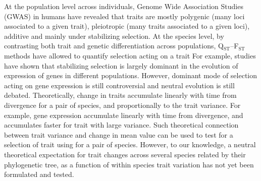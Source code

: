\documentclass{article}
\begin{document}
At the population level across individuals, Genome Wide Association Studies (GWAS) in humans have revealed that traits are mostly polygenic (many loci associated to a given trait), pleiotropic (many traits associated to a given loci), additive and mainly under stabilizing selection\cite{simons_population_2018, sella_thinking_2019}.
At the species level, by contrasting both trait and genetic differentiation across populations, Q$_\text{ST}$--F$_\text{ST}$ methods have allowed to quantify selection acting on a trait\cite{martin_multivariate_2008, leinonen_qst_2013} 
For example, studies have shown that stabilizing selection is largely dominant in the evolution of expression of genes in different populations\cite{whitehead_neutral_2006, gilad_natural_2006}.
However, dominant mode of selection acting on gene expression is still controversial and neutral evolution is still debated\cite{signor_evolution_2018, price_detecting_2022}.
Theoretically, change in traits accumulate linearly with time from divergence for a pair of species, and proportionally to the trait variance\cite{lande_genetic_1980, turelli_heritable_1984}.
For example, gene expression accumulate linearly with time from divergence, and accumulates faster for trait with large variance\cite{khaitovich_neutral_2004}.
Such theoretical connection between trait variance and change in mean value can be used to test for a selection of trait using for a pair of species\cite{walsh_evolution_2018}.
However, to our knowledge, a neutral theoretical expectation for trait changes across several species related by their phylogenetic tree, as a function of within species trait variation has not yet been formulated and tested.
\end{document}
